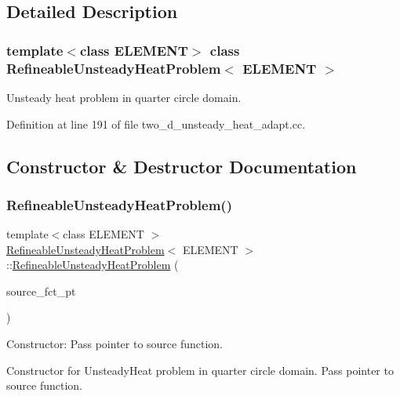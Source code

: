 \subsection{Detailed Description}
\subsubsection*{template$<$class E\+L\+E\+M\+E\+NT$>$\newline
class Refineable\+Unsteady\+Heat\+Problem$<$ E\+L\+E\+M\+E\+N\+T $>$}

Unsteady heat problem in quarter circle domain. 

Definition at line 191 of file two\+\_\+d\+\_\+unsteady\+\_\+heat\+\_\+adapt.\+cc.



\subsection{Constructor \& Destructor Documentation}
\mbox{\label{classRefineableUnsteadyHeatProblem_a894f3bd6c1c23c307a736de6898e4e98}} 
\subsubsection{\texorpdfstring{Refineable\+Unsteady\+Heat\+Problem()}{RefineableUnsteadyHeatProblem()}}
{\footnotesize\ttfamily template$<$class E\+L\+E\+M\+E\+NT $>$ \\
\hyperlink{classRefineableUnsteadyHeatProblem}{Refineable\+Unsteady\+Heat\+Problem}$<$ E\+L\+E\+M\+E\+NT $>$\+::\hyperlink{classRefineableUnsteadyHeatProblem}{Refineable\+Unsteady\+Heat\+Problem} (\begin{DoxyParamCaption}\item[{Unsteady\+Heat\+Equations$<$ 2 $>$\+::Unsteady\+Heat\+Source\+Fct\+Pt}]{source\+\_\+fct\+\_\+pt }\end{DoxyParamCaption})}



Constructor\+: Pass pointer to source function. 

Constructor for Unsteady\+Heat problem in quarter circle domain. Pass pointer to source function. 

